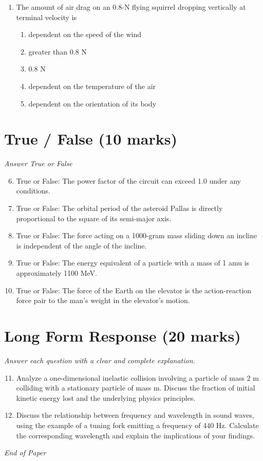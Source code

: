 \documentclass[12pt]{article}
\begin{document}
\begin{enumerate}[label=\arabic*.]
\begin{enumerate}[label=(\alph*)]
    \item remains the same
    \item halves
    \item quadruples
\end{enumerate}
\item The amount of air drag on an 0.8-N flying squirrel dropping vertically at terminal velocity is
\begin{enumerate}[label=(\alph*)]
    \item dependent on the speed of the wind
    \item greater than 0.8 N
    \item 0.8 N
    \item dependent on the temperature of the air
    \item dependent on the orientation of its body
\end{enumerate}
\end{enumerate}

\section*{True / False (10 marks)}
\textit{Answer True or False}
\begin{enumerate}[label=\arabic*.]
\setcounter{enumi}{5}
\item True or False: The power factor of the circuit can exceed 1.0 under any conditions.
\item True or False: The orbital period of the asteroid Pallas is directly proportional to the square of its semi-major axis.
\item True or False: The force acting on a 1000-gram mass sliding down an incline is independent of the angle of the incline.
\item True or False: The energy equivalent of a particle with a mass of 1 amu is approximately 1100 MeV.
\item True or False: The force of the Earth on the elevator is the action-reaction force pair to the man's weight in the elevator's motion.
\end{enumerate}

\section*{Long Form Response (20 marks)}
\textit{Answer each question with a clear and complete explanation.}
\begin{enumerate}[label=\arabic*.]
\setcounter{enumi}{10}
\item Analyze a one-dimensional inelastic collision involving a particle of mass 2 m colliding with a stationary particle of mass m. Discuss the fraction of initial kinetic energy lost and the underlying physics principles.
\item Discuss the relationship between frequency and wavelength in sound waves, using the example of a tuning fork emitting a frequency of 440 Hz. Calculate the corresponding wavelength and explain the implications of your findings.
\end{enumerate}

\vfill
\noindent\textit{End of Paper}
\end{document}

